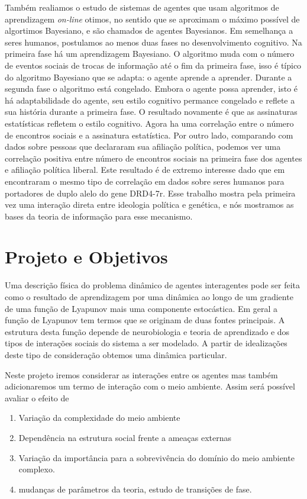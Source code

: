 \documentclass[12pt]{article}
\begin{document}
Também realiamos o
 estudo de sistemas de agentes que usam algoritmos de aprendizagem {\it on-line}
otimos, no sentido que se aproximam o máximo possível de algortimos Bayesiano,
e são chamados de agentes Bayesianos. Em semelhança a seres humanos, postulamos
ao menos duas fases no desenvolvimento cognitivo. Na primeira fase
há um aprendizagem Bayesiano. O algoritmo muda com o número de eventos
sociais de trocas de informação até o fim da primeira fase, isso é
típico do algoritmo Bayesiano que se adapta: o agente aprende a aprender. Durante a
segunda fase o algoritmo está congelado. Embora o agente possa aprender, isto é 
há adaptabilidade do agente, seu estilo cognitivo permance congelado e 
reflete a sua história durante a primeira fase. O resultado novamente
 é que as assinaturas estatísticas refletem o estilo cognitivo. Agora
ha uma correlação entre o número de encontros sociais e a  assinatura estatística.
Por outro lado, comparando com dados sobre pessoas que declararam sua 
afiliação política, podemos ver uma correlação positiva entre número de encontros sociais
na primeira fase dos agentes e afiliação política liberal. 
Este resultado é de extremo interesse dado que em 
\cite{Settle2010a}  encontraram o mesmo tipo de correlação em dados sobre seres humanos
para portadores de duplo alelo do gene DRD4-7r. Esse trabalho 
mostra pela primeira vez uma interação direta entre ideologia política
e genética, e nós mostramos as bases da teoria de informação para esse mecanismo.


\newpage
\section{Projeto e Objetivos}
Uma descrição física do problema dinâmico de agentes interagentes pode ser feita  
como o  resultado de aprendizagem por uma dinâmica ao
longo de um gradiente de uma função de Lyapunov mais uma componente estocástica.
Em geral a função de Lyapunov tem termos que se originam de duas fontes principais.
A estrutura desta função depende  de neurobiologia e teoria de aprendizado 
e dos tipos de interações sociais do sistema a ser modelado. A partir
de idealizações deste tipo de consideração obtemos uma dinâmica particular.

Neste projeto iremos considerar as interações entre os agentes mas
também adicionaremos um termo de interação com o meio ambiente. 
Assim será possível avaliar o efeito de 
\begin{enumerate}
\item Variação da complexidade do meio ambiente
\item Dependência na estrutura social frente a ameaças externas
\item Variação da importância para a sobrevivência do domínio do meio ambiente complexo.
\item mudanças de parâmetros da teoria, estudo de transições de fase.
\end{enumerate}
\end{document}
